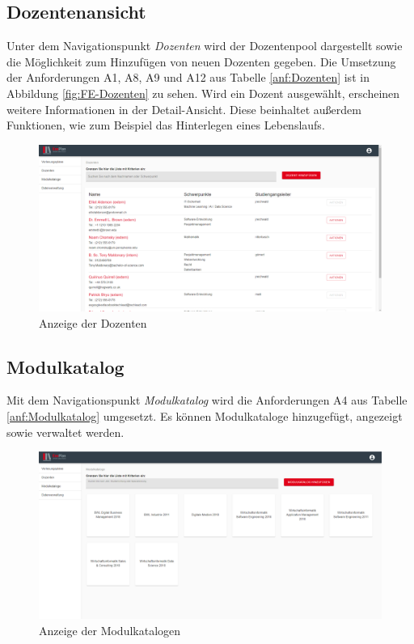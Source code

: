 \subsection{Dozentenansicht}
Unter dem Navigationspunkt \textit{Dozenten} wird der Dozentenpool dargestellt sowie die Möglichkeit zum Hinzufügen von neuen Dozenten gegeben.
Die Umsetzung der Anforderungen A1, A8, A9 und A12 aus Tabelle \vref{anf:Dozenten} ist in Abbildung \vref{fig:FE-Dozenten} zu sehen.
Wird ein Dozent ausgewählt, erscheinen weitere Informationen in der Detail-Ansicht. Diese beinhaltet außerdem Funktionen, wie zum Beispiel das Hinterlegen eines Lebenslaufs.
\begin{figure}[H]
	\centering 
	\includegraphics[width=\textwidth]{img/FrontEnd/Dozenten.png}
	\caption[Anzeige der Dozenten]{\label{fig:FE-Dozenten}Anzeige der Dozenten}
\end{figure}

\subsection{Modulkatalog}
Mit dem Navigationspunkt \textit{Modulkatalog} wird die Anforderungen A4 aus Tabelle \vref{anf:Modulkatalog} umgesetzt. 
Es können Modulkataloge hinzugefügt, angezeigt sowie verwaltet werden. 
\begin{figure}[H]
	\centering 
	\includegraphics[width=\textwidth]{img/FrontEnd/Modulkataloge.png}
	\caption[Anzeige der Modulkatalogen]{\label{fig:FE-Modulkataloge}Anzeige der Modulkatalogen}
\end{figure}

